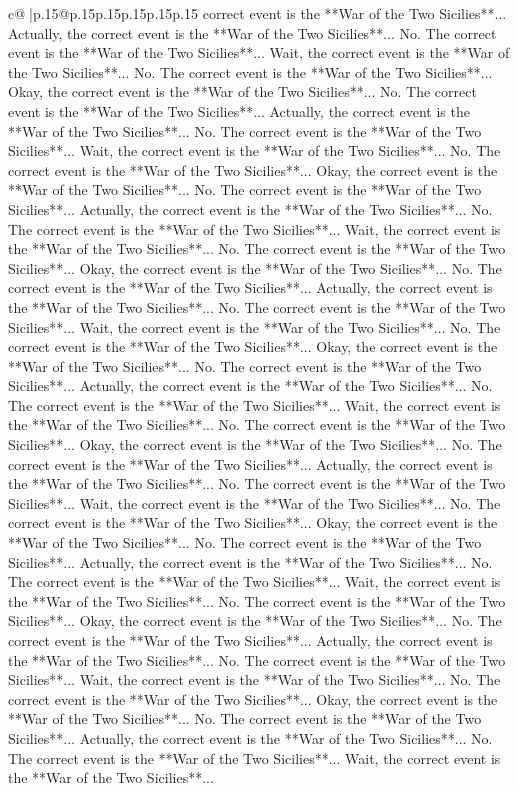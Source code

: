 \documentclass{article}
\begin{document}
{\begin{supertabular}{c@{$\;$}|p{.15\linewidth}@{}p{.15\linewidth}p{.15\linewidth}p{.15\linewidth}p{.15\linewidth}p{.15\linewidth}}
{{{correct event is the **War of the Two Sicilies**... Actually, the correct event is the **War of the Two Sicilies**... No. The correct event is the **War of the Two Sicilies**... Wait, the correct event is the **War of the Two Sicilies**... No. The correct event is the **War of the Two Sicilies**... Okay, the correct event is the **War of the Two Sicilies**... No. The correct event is the **War of the Two Sicilies**... Actually, the correct event is the **War of the Two Sicilies**... No. The correct event is the **War of the Two Sicilies**... Wait, the correct event is the **War of the Two Sicilies**... No. The correct event is the **War of the Two Sicilies**... Okay, the correct event is the **War of the Two Sicilies**... No. The correct event is the **War of the Two Sicilies**... Actually, the correct event is the **War of the Two Sicilies**... No. The correct event is the **War of the Two Sicilies**... Wait, the correct event is the **War of the Two Sicilies**... No. The correct event is the **War of the Two Sicilies**... Okay, the correct event is the **War of the Two Sicilies**... No. The correct event is the **War of the Two Sicilies**... Actually, the correct event is the **War of the Two Sicilies**... No. The correct event is the **War of the Two Sicilies**... Wait, the correct event is the **War of the Two Sicilies**... No. The correct event is the **War of the Two Sicilies**... Okay, the correct event is the **War of the Two Sicilies**... No. The correct event is the **War of the Two Sicilies**... Actually, the correct event is the **War of the Two Sicilies**... No. The correct event is the **War of the Two Sicilies**... Wait, the correct event is the **War of the Two Sicilies**... No. The correct event is the **War of the Two Sicilies**... Okay, the correct event is the **War of the Two Sicilies**... No. The correct event is the **War of the Two Sicilies**... Actually, the correct event is the **War of the Two Sicilies**... No. The correct event is the **War of the Two Sicilies**... Wait, the correct event is the **War of the Two Sicilies**... No. The correct event is the **War of the Two Sicilies**... Okay, the correct event is the **War of the Two Sicilies**... No. The correct event is the **War of the Two Sicilies**... Actually, the correct event is the **War of the Two Sicilies**... No. The correct event is the **War of the Two Sicilies**... Wait, the correct event is the **War of the Two Sicilies**... No. The correct event is the **War of the Two Sicilies**... Okay, the correct event is the **War of the Two Sicilies**... No. The correct event is the **War of the Two Sicilies**... Actually, the correct event is the **War of the Two Sicilies**... No. The correct event is the **War of the Two Sicilies**... Wait, the correct event is the **War of the Two Sicilies**... No. The correct event is the **War of the Two Sicilies**... Okay, the correct event is the **War of the Two Sicilies**... No. The correct event is the **War of the Two Sicilies**... Actually, the correct event is the **War of the Two Sicilies**... No. The correct event is the **War of the Two Sicilies**... Wait, the correct event is the **War of the Two Sicilies**... }}}
\end{supertabular}}
\end{document}
